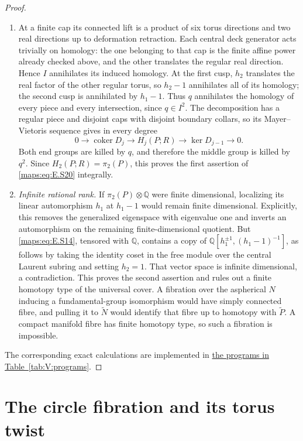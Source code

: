 \documentclass[11pt,a4paper]{article}
\numberwithin{equation}{section}
\theoremstyle{definition}
\begin{document}
\begin{proof}
\begin{enumerate}[label=\arabic*.,leftmargin=*]
\item At a finite cap its connected lift is a product of six torus
directions and two real directions up to deformation retraction.
Each central deck generator acts trivially on homology: the
one belonging to that cap is the finite affine power already
checked above, and the other translates the regular real
direction. Hence $I$ annihilates its induced homology. At the
first cusp, $h_2$ translates the real factor of the other
regular torus, so $h_2-1$ annihilates all of its homology;
the second cusp is annihilated by $h_1-1$. Thus $q$ annihilates
the homology of every piece and every intersection, since
$q\in I^2$. The decomposition has a regular piece and disjoint
caps with disjoint boundary collars, so its Mayer--Vietoris
sequence gives in every degree
\[
 0\longrightarrow\operatorname{coker}D_j
   \longrightarrow H_j(P;R)
   \longrightarrow\ker D_{j-1}\longrightarrow0.
\]
Both end groups are killed by $q$, and therefore the middle
group is killed by $q^2$. Since $H_2(P;R)=\pi_2(P)$, this
proves the first assertion of \eqref{maps:eq:E.S20} integrally.

\item \emph{Infinite rational rank.}
If $\pi_2(P)\otimes\mathbb Q$ were finite dimensional,
localizing its linear automorphism $h_1$ at $h_1-1$ would
remain finite dimensional. Explicitly, this removes the
generalized eigenspace with eigenvalue one and inverts an
automorphism on the remaining finite-dimensional quotient.
But \eqref{maps:eq:E.S14}, tensored with $\mathbb Q$, contains a copy of
$\mathbb Q[h_1^{\pm1},(h_1-1)^{-1}]$, as follows by taking
the identity coset in the free module over the central
Laurent subring and setting $h_2=1$. That vector space is
infinite dimensional, a contradiction. This proves the
second assertion and rules out a finite homotopy type of
the universal cover. A fibration over the aspherical $N$
inducing a fundamental-group isomorphism would have simply
connected fibre, and pulling it to $\widetilde N$ would
identify that fibre up to homotopy with $\widetilde P$.
A compact manifold fibre has finite homotopy type, so such
a fibration is impossible.

\end{enumerate}
The corresponding exact calculations are implemented in \hyperlink{prog:V:equivariant}{the programs in Table~\ref*{tab:V:programs}}.
\end{proof}

\section{The circle fibration and its torus twist}\label{pub:V:sec-torus-twist}
\end{document}
